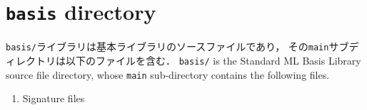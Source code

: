 \documentclass{jbook}
\newcommand{\txt}[2]{#2}
\newcommand{\code}[1]{\mbox{\large\tt #1}}
\begin{document}
\section{
\txt{\code{basis}ディレクトリ}
{\code{basis} directory}
}

\ifjp%
	\code{basis/}ライブラリは基本ライブラリのソースファイルであり，
その\code{main}サブディレクトリは以下のファイルを含む．
\else%
	\code{basis/} is the Standard ML Basis Library source file directory,
whose \code{main} sub-directory contains the following files.
\fi%

\begin{enumerate}
\item \txt{シグネチャファイル}{Signature files}


\end{enumerate}
\end{document}
